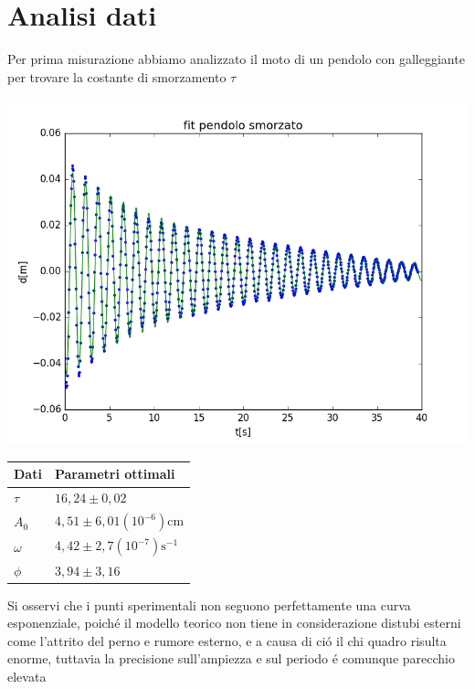 \documentclass{exam}
\begin{document}
	\section{Analisi dati}
		Per prima misurazione abbiamo analizzato il moto di un pendolo con galleggiante per trovare la costante di smorzamento $\tau$ \\
		\begin{minipage}{0.5\textwidth}
			\includegraphics[width=\textwidth]{fit_smorzato}
			\end{minipage}
		\begin{minipage}{0.5\textwidth}
			\begin{tabular}{ll}
				\toprule
				Dati & Parametri ottimali \\
				\midrule
				$\tau$ & $16,24 \pm 0,02$ \\
				$A_{0}$ & $4,51 \pm 6,01(10^{-6})$cm\\
				$\omega$ & $4,42 \pm 2,7(10^{-7})\textrm{s}^{-1}$\\			
				$\phi$ & $3,94 \pm 3,16$\\
				\bottomrule

			\end{tabular}
		\end{minipage}
		Si osservi che i punti sperimentali non seguono perfettamente una curva esponenziale, poich\'e il modello teorico non tiene in considerazione distubi esterni come l'attrito del perno e rumore esterno, e a causa di ci\'o il chi quadro risulta enorme, tuttavia la precisione sull'ampiezza e sul periodo \'e comunque parecchio elevata\par \bigskip
\end{document}
